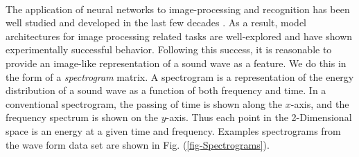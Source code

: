 \documentclass[12pt,letterpaper]{article}
\begin{document}
\paragraph*{}The application of neural networks to image-processing and recognition has been well studied and developed in the last few decades \cite{Geron,Goodfellow,Loy,Mierswa}. As a result, model architectures for image processing related tasks are well-explored and have shown experimentally successful behavior. Following this success, it is reasonable to provide an image-like representation of a sound wave as a feature. We do this in the form of a \textit{spectrogram} matrix. A spectrogram is a representation of the energy distribution of a sound wave as a function of both frequency and time. In a conventional spectrogram, the passing of time is shown along the $x$-axis, and the frequency spectrum is shown on the $y$-axis. Thus each point in the 2-Dimensional space is an energy at a given time and frequency. Examples spectrograms from the wave form data set are shown in Fig. (\ref{fig-Spectrograms}).
\end{document}
